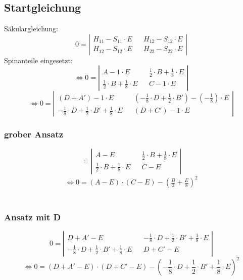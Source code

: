 \documentclass[12pt,a4paper]{article}
\begin{document}
\subsection{Startgleichung}
Säkulargleichung: 
$$ 0 = \left|
  \begin{array}{ccc}
  H_{11} - S_{11} \cdot E && H_{12} - S_{12}\cdot E \\
  H_{12} - S_{12}\cdot E && H_{22} - S_{22} \cdot E 
  \end{array}
  \right|
  $$
  Spinanteile eingesetzt:
  $$ \Leftrightarrow  0 = \left|
  \begin{array}{ccc}
  A - 1 \cdot E && \frac{1}{2} \cdot B + \frac{1}{8}\cdot E \\
  \frac{1}{2} \cdot B + \frac{1}{8} \cdot E && C - 1 \cdot E 
  \end{array}
  \right|
  $$
  $$\Leftrightarrow 0 = \left|
  \begin{array}{ccc}
  \left( D+A' \right) -  1  \cdot E && \left( - \frac{1}{8} \cdot D + \frac{1}{2} \cdot B' \right) - \left( - \frac{1}{8} \right)\cdot E \\
 -\frac{1}{8}\cdot D + \frac{1}{2} \cdot B'
 + \frac{1}{8} \cdot E && \left(D+C' \right)  - 1  \cdot E 
  \end{array}
  \right|
  $$
  
  
\subsubsection{grober Ansatz}

 $$   = \left|
  \begin{array}{ccc}
  A - E && \frac{1}{2} \cdot B + \frac{1}{8}\cdot E \\
  \frac{1}{2} \cdot B + \frac{1}{8} \cdot E && C -  E 
  \end{array}
  \right|
  $$
  \begin{gather}
  \label{eq:grobGl}
  \Leftrightarrow 0 = \left( A-E\right) \cdot \left( C-E\right) 
  - \left( \frac{B}{2} + \frac{E}{8}\right) ^2 
  \end{gather} \\

  
\subsubsection{Ansatz mit D}
  $$ 0 = \left|
  \begin{array}{ccc}
 D+A'  -  E &&  -\frac{1}{8}\cdot D + \frac{1}{2} \cdot B'
 + \frac{1}{8} \cdot E\\
 -\frac{1}{8}\cdot D + \frac{1}{2} \cdot B'
 + \frac{1}{8} \cdot E && D+C'   -  E 
  \end{array}
  \right|
  $$
  $$ \Leftrightarrow 0 = 
  \left( D+A'-E\right) \cdot \left( D+C'-E\right) 
  - \left( -\frac{1}{8}\cdot D + \frac{1}{2} \cdot B'
 + \frac{1}{8} \cdot E  \right) ^2 
  $$
\end{document}
